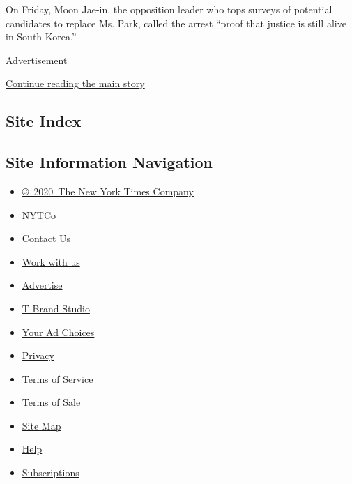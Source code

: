 On Friday, Moon Jae-in, the opposition leader who tops surveys of
potential candidates to replace Ms. Park, called the arrest ``proof that
justice is still alive in South Korea.''

Advertisement

\protect\hyperlink{after-bottom}{Continue reading the main story}

\hypertarget{site-index}{%
\subsection{Site Index}\label{site-index}}

\hypertarget{site-information-navigation}{%
\subsection{Site Information
Navigation}\label{site-information-navigation}}

\begin{itemize}
\tightlist
\item
  \href{https://help.nytimes3xbfgragh.onion/hc/en-us/articles/115014792127-Copyright-notice}{©~2020~The
  New York Times Company}
\end{itemize}

\begin{itemize}
\tightlist
\item
  \href{https://www.nytco.com/}{NYTCo}
\item
  \href{https://help.nytimes3xbfgragh.onion/hc/en-us/articles/115015385887-Contact-Us}{Contact
  Us}
\item
  \href{https://www.nytco.com/careers/}{Work with us}
\item
  \href{https://nytmediakit.com/}{Advertise}
\item
  \href{http://www.tbrandstudio.com/}{T Brand Studio}
\item
  \href{https://www.nytimes3xbfgragh.onion/privacy/cookie-policy\#how-do-i-manage-trackers}{Your
  Ad Choices}
\item
  \href{https://www.nytimes3xbfgragh.onion/privacy}{Privacy}
\item
  \href{https://help.nytimes3xbfgragh.onion/hc/en-us/articles/115014893428-Terms-of-service}{Terms
  of Service}
\item
  \href{https://help.nytimes3xbfgragh.onion/hc/en-us/articles/115014893968-Terms-of-sale}{Terms
  of Sale}
\item
  \href{https://spiderbites.nytimes3xbfgragh.onion}{Site Map}
\item
  \href{https://help.nytimes3xbfgragh.onion/hc/en-us}{Help}
\item
  \href{https://www.nytimes3xbfgragh.onion/subscription?campaignId=37WXW}{Subscriptions}
\end{itemize}
